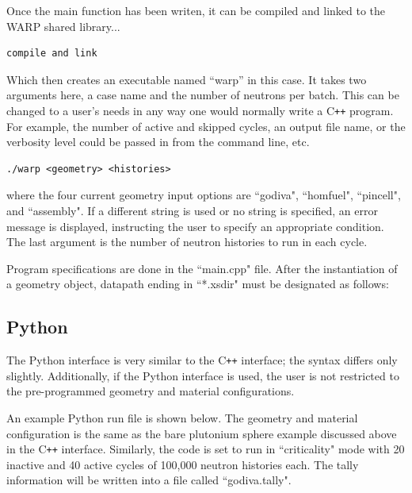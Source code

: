 \documentclass[twoside,a4paper]{refart}
\begin{document}
Once the main function has been writen, it can be compiled and linked to the WARP shared library...

\begin{verbatim}
compile and link
\end{verbatim}

Which then creates an executable named ``warp'' in this case.  It takes two arguments here, a case name and the number of neutrons per batch.  This can be changed to a user's needs in any way one would normally write a C\texttt{++} program.  For example, the number of active and skipped cycles, an output file name, or the verbosity level could be passed in from the command line, etc.

\begin{verbatim}
./warp <geometry> <histories>
\end{verbatim}

where the four current geometry input options are ``godiva", ``homfuel", ``pincell", and ``assembly". If 
a different string is used or no string is specified, an error message is displayed, instructing the 
user to specify an appropriate condition. The last argument is the number of neutron histories to run in 
each cycle.

Program specifications are done in the ``main.cpp" file. After the instantiation of a geometry object, 
datapath ending in ``*.xsdir" must be designated as follows:

\subsection{Python}

The Python interface is very similar to the C\texttt{++} interface; the syntax differs only slightly.
Additionally, if the Python interface is used, the user is not restricted to the pre-programmed 
geometry and material configurations.

An example Python run file is shown below. The geometry and material configuration is the same as the
bare plutonium sphere example discussed above in the C\texttt{++} interface. Similarly, the code is set
to run in ``criticality" mode with 20 inactive and 40 active cycles of 100,000 neutron histories each.
The tally information will be written into a file called ``godiva.tally".
\end{document}
